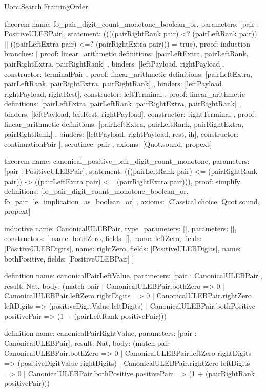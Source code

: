 \begin{lexlean}{Uorc.Search.FramingOrder}
\begin{semanticmodule}
theorem{
  name: fo_pair_digit_count_monotone_boolean_or,
  parameters: [pair : PositiveULEBPair],
  statement: ((((pairRightRank pair) <? (pairLeftRank pair)) || ((pairLeftExtra pair) <=? (pairRightExtra pair))) = true),
  proof: induction{
    branches: [
      {
        proof: linear_arithmetic{
          definitions: [pairLeftExtra, pairLeftRank, pairRightExtra, pairRightRank]
        },
        binders: [leftPayload, rightPayload],
        constructor: terminalPair
      },
      {
        proof: linear_arithmetic{
          definitions: [pairLeftExtra, pairLeftRank, pairRightExtra, pairRightRank]
        },
        binders: [leftPayload, rightPayload, rightRest],
        constructor: leftTerminal
      },
      {
        proof: linear_arithmetic{
          definitions: [pairLeftExtra, pairLeftRank, pairRightExtra, pairRightRank]
        },
        binders: [leftPayload, leftRest, rightPayload],
        constructor: rightTerminal
      },
      {
        proof: linear_arithmetic{
          definitions: [pairLeftExtra, pairLeftRank, pairRightExtra, pairRightRank]
        },
        binders: [leftPayload, rightPayload, rest, ih],
        constructor: continuationPair
      }
    ],
    scrutinee: pair
  },
  axioms: [Quot.sound, propext]
}

theorem{
  name: canonical_positive_pair_digit_count_monotone,
  parameters: [pair : PositiveULEBPair],
  statement: (((pairLeftRank pair) <= (pairRightRank pair)) -> ((pairLeftExtra pair) <= (pairRightExtra pair))),
  proof: simplify{
    definitions: [fo_pair_digit_count_monotone_boolean_or, fo_pair_le_implication_as_boolean_or]
  },
  axioms: [Classical.choice, Quot.sound, propext]
}

inductive{
  name: CanonicalULEBPair,
  type_parameters: [],
  parameters: [],
  constructors: [
    {name: bothZero, fields: []},
    {name: leftZero, fields: [PositiveULEBDigits]},
    {name: rightZero, fields: [PositiveULEBDigits]},
    {name: bothPositive, fields: [PositiveULEBPair]}
  ]
}

definition{
  name: canonicalPairLeftValue,
  parameters: [pair : CanonicalULEBPair],
  result: Nat,
  body: (match pair
    | CanonicalULEBPair.bothZero => 0
    | CanonicalULEBPair.leftZero rightDigits => 0
    | CanonicalULEBPair.rightZero leftDigits => (positiveDigitValue leftDigits)
    | CanonicalULEBPair.bothPositive positivePair => (1 + (pairLeftRank positivePair)))
}

definition{
  name: canonicalPairRightValue,
  parameters: [pair : CanonicalULEBPair],
  result: Nat,
  body: (match pair
    | CanonicalULEBPair.bothZero => 0
    | CanonicalULEBPair.leftZero rightDigits => (positiveDigitValue rightDigits)
    | CanonicalULEBPair.rightZero leftDigits => 0
    | CanonicalULEBPair.bothPositive positivePair => (1 + (pairRightRank positivePair)))
}


\end{semanticmodule}
\end{lexlean}
